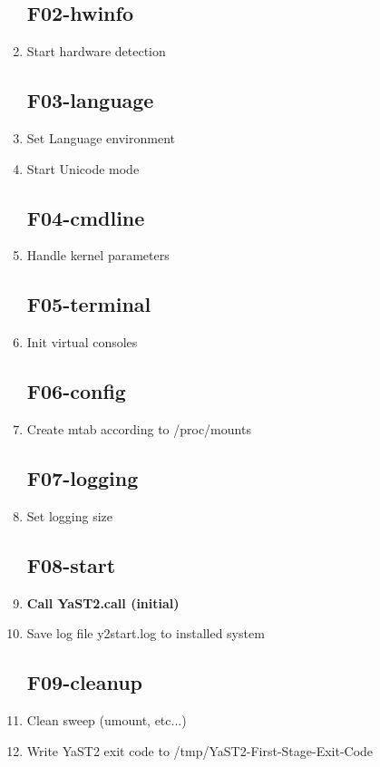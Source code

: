 \begin{enumerate}
\subsection{F02-hwinfo}
\item Start hardware detection
\subsection{F03-language}
\item Set Language environment
\item Start Unicode mode
\subsection{F04-cmdline}
\item Handle kernel parameters
\subsection{F05-terminal}
\item Init virtual consoles
\subsection{F06-config}
\item Create mtab according to /proc/mounts
\subsection{F07-logging}
\item Set logging size
\subsection{F08-start}
\item \textbf{Call YaST2.call (initial)}
\item Save log file y2start.log to installed system
\subsection{F09-cleanup}
\item Clean sweep (umount, etc...)
\item Write YaST2 exit code to /tmp/YaST2-First-Stage-Exit-Code
\end{enumerate}

